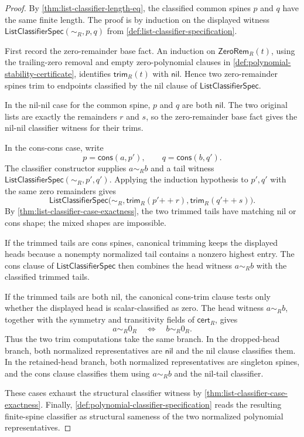 \begin{proof}
By \autoref{thm:list-classifier-length-eq}, the classified common spines $p$ and $q$ have the same finite length. The proof is by induction on the displayed witness $\mathsf{ListClassifierSpec}(\sim_R,p,q)$ from \autoref{def:list-classifier-specification}.

First record the zero-remainder base fact. An induction on $\mathsf{ZeroRem}_R(t)$, using the trailing-zero removal and empty zero-polynomial clauses in \autoref{def:polynomial-stability-certificate}, identifies $\mathsf{trim}_R(t)$ with $\mathsf{nil}$. Hence two zero-remainder spines trim to endpoints classified by the nil clause of $\mathsf{ListClassifierSpec}$.

In the nil-nil case for the common spine, $p$ and $q$ are both $\mathsf{nil}$. The two original lists are exactly the remainders $r$ and $s$, so the zero-remainder base fact gives the nil-nil classifier witness for their trims.

In the cons-cons case, write
$$
p=\mathsf{cons}(a,p'),
\qquad
q=\mathsf{cons}(b,q').
$$
The classifier constructor supplies $a\sim_R b$ and a tail witness $\mathsf{ListClassifierSpec}(\sim_R,p',q')$. Applying the induction hypothesis to $p',q'$ with the same zero remainders gives
$$
\mathsf{ListClassifierSpec}\bigl(\sim_R,\mathsf{trim}_R(p'{++}r),\mathsf{trim}_R(q'{++}s)\bigr).
$$
By \autoref{thm:list-classifier-case-exactness}, the two trimmed tails have matching nil or cons shape; the mixed shapes are impossible.

If the trimmed tails are cons spines, canonical trimming keeps the displayed heads because a nonempty normalized tail contains a nonzero highest entry. The cons clause of $\mathsf{ListClassifierSpec}$ then combines the head witness $a\sim_R b$ with the classified trimmed tails.

If the trimmed tails are both nil, the canonical cons-trim clause tests only whether the displayed head is scalar-classified as zero. The head witness $a\sim_R b$, together with the symmetry and transitivity fields of $\mathsf{cert}_R$, gives
$$
a\sim_R0_R
\quad\Longleftrightarrow\quad
b\sim_R0_R.
$$
Thus the two trim computations take the same branch. In the dropped-head branch, both normalized representatives are $\mathsf{nil}$ and the nil clause classifies them. In the retained-head branch, both normalized representatives are singleton spines, and the cons clause classifies them using $a\sim_R b$ and the nil-tail classifier.

These cases exhaust the structural classifier witness by \autoref{thm:list-classifier-case-exactness}. Finally, \autoref{def:polynomial-classifier-specification} reads the resulting finite-spine classifier as structural sameness of the two normalized polynomial representatives.
\end{proof}

